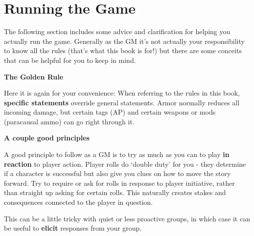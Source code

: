 \section{Running the Game}

The following section includes some advice and clarification for helping you actually run the
game. Generally as the GM it's not actually your responsibility to know all the rules (that's what
this book is for!) but there are some conceits that can be helpful for you to keep in mind.

\begin{center}
    \textbf{The Golden Rule}
\end{center}

Here it is again for your convenience: When referring to the rules in this book, \textbf{specific
statements} override general statements. Armor normally reduces all incoming damage, but
certain tags (AP) and certain weapons or mods (paracausal ammo) can go right through it.

\begin{center}
\textbf{A couple good principles}
\end{center}
                                       
A good principle to follow as a GM is to try as much as you can to play \textbf{in reaction} to player
action. Player rolls do `double duty' for you - they determine if a character is successful but also
give you clues on how to move the story forward. Try to require or ask for rolls in response to
player initiative, rather than straight up asking for certain rolls. This naturally creates stakes and
consequences connected to the player in question.

This can be a little tricky with quiet or less proactive groups, in which case it can be useful to
\textbf{elicit} responses from your group.

